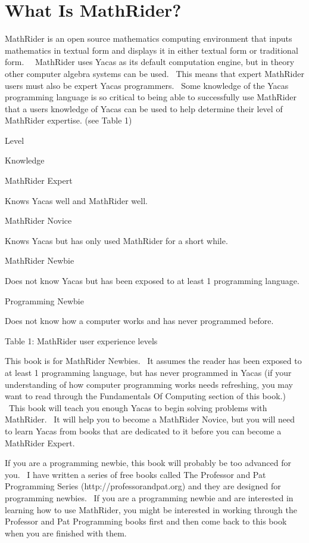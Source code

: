 \documentclass[12pt,twoside]{book}
\begin{document}
\section[What Is MathRider?]{What Is MathRider?}

MathRider is an open source mathematics computing environment that inputs mathematics in textual form and displays it in either textual form or traditional form. \ \ MathRider uses Yacas as its default computation engine, but in theory other computer algebra systems can be used. \ This means that expert MathRider users must also be expert Yacas programmers. \ Some knowledge of the Yacas programming language is so critical to being able to successfully use MathRider that a user{\textquotesingle}s knowledge of Yacas can be used to help determine their level of MathRider expertise. (see Table 1) 

\bigskip

Level

Knowledge

MathRider Expert

Knows Yacas well and MathRider well.

MathRider Novice

Knows Yacas but has only used MathRider for a short while.

MathRider Newbie

Does not know Yacas but has been exposed to at least 1 programming
language.

Programming Newbie

Does not know how a computer works and has never programmed before.

Table 1: MathRider user experience levels


\bigskip

This book is for MathRider Newbies. \ It assumes the reader has been exposed to at least 1 programming language, but has never programmed in Yacas (if your understanding of how computer programming works needs refreshing, you may want to read through the Fundamentals Of Computing section of this book.) \ This book will teach you enough Yacas to begin solving problems with MathRider. \ It will help you to become a MathRider Novice, but you will need to learn Yacas from books that are dedicated to it before you can become a MathRider Expert. \  

\bigskip

If you are a programming newbie, this book will probably be too advanced for you. \ I have written a series of free books called The Professor and Pat Programming Series (http://professorandpat.org) and they are designed for programming newbies. \ If you are a programming newbie and are interested in learning how to use MathRider, you might be interested in working through the Professor and Pat Programming books first and then come back to this book when you are finished with them. \ 
\end{document}
